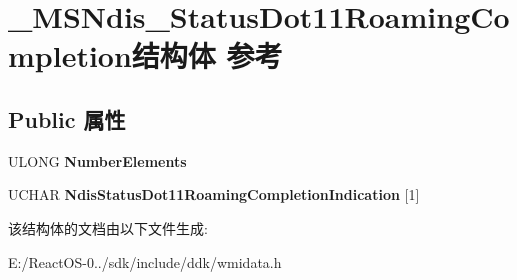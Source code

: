 \hypertarget{struct___m_s_ndis___status_dot11_roaming_completion}{}\section{\+\_\+\+M\+S\+Ndis\+\_\+\+Status\+Dot11\+Roaming\+Completion结构体 参考}
\label{struct___m_s_ndis___status_dot11_roaming_completion}
\subsection*{Public 属性}
\begin{DoxyCompactItemize}
\item 
\mbox{\label{struct___m_s_ndis___status_dot11_roaming_completion_aacdc51aa01a9437433543743c9eff40a}} 
U\+L\+O\+NG {\bfseries Number\+Elements}
\item 
\mbox{\label{struct___m_s_ndis___status_dot11_roaming_completion_aef66adcc7f0d4b7eba435a7fbeae5726}} 
U\+C\+H\+AR {\bfseries Ndis\+Status\+Dot11\+Roaming\+Completion\+Indication} \mbox{[}1\mbox{]}
\end{DoxyCompactItemize}


该结构体的文档由以下文件生成\+:\begin{DoxyCompactItemize}
\item 
E\+:/\+React\+O\+S-\/0../sdk/include/ddk/wmidata.\+h\end{DoxyCompactItemize}

